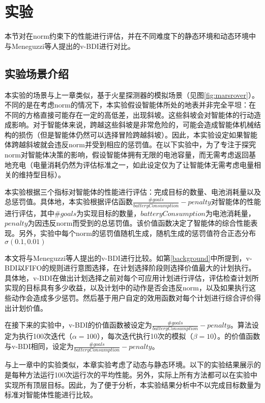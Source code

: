 \section{实验}
本节对\SAN 在norm约束下的性能进行评估，并在不同难度下的静态环境和动态环境中与Meneguzzi等人\cite{DBLP:journals/eaai/MeneguzziROVL15}提出的v-BDI进行对比。
\subsection{实验场景介绍}
本实验的场景与上一章类似，基于火星探测器的模拟场景（见图\ref{fig:marsrover}）。不同的是在考虑norm的情况下，本实验假设智能体所处的地表并非完全平坦：在不同的方格直接可能存在一定的高低差，出现斜坡。这些斜坡会对智能体的行动造成影响。对于智能体来说，跨越这些斜坡是非常危险的，可能会造成智能体机械结构的损伤（但是智能体仍然可以选择冒险跨越斜坡）。因此，本实验设定如果智能体跨越斜坡就会违反norm并受到相应的惩罚值。在以下实验中，为了专注于探究norm对智能体决策的影响，假设智能体拥有无限的电池容量，而无需考虑返回基地充电（电量消耗仍然为评估标准之一，如此设定仅为了让智能体无需考虑电量相关的维持型目标）。

本实验根据三个指标对智能体的性能进行评估：完成目标的数量、电池消耗量以及总惩罚值。具体地，本实验根据评估函数$\frac{\#goals}{batteryConsumption} - penalty$对智能体的性能进行评估，其中$\#goals$为实现目标的数量，$batteryConsumption$为电池消耗量，$penalty$为因违反norm而受到的总惩罚值。该价值函数决定了智能体的综合性能表现。另外，实验中每个norm的惩罚值随机生成，随机生成的惩罚值符合正态分布$\sigma(0.1, 0.01)$

本文将\SAN 与Meneguzzi等人提出的v-BDI\cite{DBLP:journals/eaai/MeneguzziROVL15}进行比较。如第\ref{background}中所提到，v-BDI以FIFO的规则进行意图选择，在计划选择阶段则选择价值最大的计划执行。具体地，v-BDI在做出计划选择之前对每个可应用计划进行评估，评估检查计划所实现的目标具有多少收益，以及计划中的动作是否会违反norm，以及如果执行这些动作会造成多少惩罚。然后基于用户自定的效用函数对每个计划进行综合评价得出计划价值。

在接下来的实验中，v-BDI的价值函数被设定为$\frac{\#goals}{batteryConsumption} - penalty$。\SAN 算法设定为执行100次迭代（$\alpha = 100$），每次迭代执行10次的模拟（$\beta = 10$）。\SAN 的价值函数与v-BDI相同，设定为$\frac{\#goals}{batteryConsumption} - penalty$。

与上一章中的实验类似，本章实验考虑了动态与静态环境。以下的实验结果展示的是每种方法运行100次运行次的平均性能。另外，实际上所有方法都可以在实验中实现所有顶层目标。因此，为了便于分析，本实验结果分析中不以完成目标数量为标准对智能体性能进行比较。


